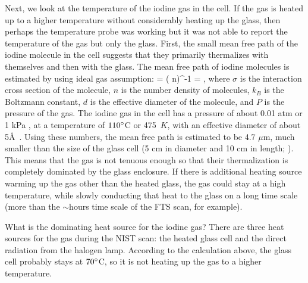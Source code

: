 Next, we look at the temperature of the iodine gas in the cell. If the
gas is heated up to a higher temperature without considerably heating
up the glass, then perhaps the temperature probe was working but it
was not able to report the temperature of the gas but only the
glass. First, the small mean free path of the iodine molecule in the
cell suggests that they primarily thermalizes with themselves and then
with the glass. The mean free path of iodine molecules is estimated by
using ideal gas assumption:
\beq
\lambda = ( \sigma \cdot n)^{-1} = ,
\eeq
where $\sigma$ is the interaction cross section of the molecule, $n$
is the number density of molecules, $k_B$ is the Boltzmann constant,
$d$ is the effective diameter of the molecule, and $P$ is the pressure
of the gas. The iodine gas in the cell has a pressure of about 0.01
atm or 1 kPa \citep{butler1996}, at a temperature of $110^{\circ}$C or
475~$K$, with an effective diameter of about
5\AA\ \citep{JUHOLA1975437,topley1926size}. Using these numbers, the
mean free path is estimated to be 4.7 $\mu$m, much smaller than the
size of the glass cell (5 cm in diameter and 10 cm in
length; \citealt{butler1996}). This means that the gas is not tenuous
enough so that their thermalization is completely dominated by the
glass enclosure. If there is additional heating source warming up the
gas other than the heated glass, the gas could stay at a high
temperature, while slowly conducting that heat to the glass on a long
time scale (more than the $\sim$hours time scale of the FTS scan, for
example).

What is the dominating heat source for the iodine gas? There are three
heat sources for the gas during the NIST scan: the heated glass cell
and the direct radiation from the halogen lamp. According to the
calculation above, the glass cell probably stays at $70^{\circ}$C, so
it is not heating up the gas to a higher temperature. 

